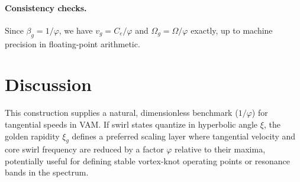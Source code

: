 \documentclass[11pt]{article}
\begin{document}
\paragraph{Consistency checks.}
Since $\beta_g=1/\varphi$, we have $v_g=C_e/\varphi$ and $\Omega_g=\Omega/\varphi$ exactly, up to machine precision in floating-point arithmetic.

\section*{Discussion}
This construction supplies a natural, dimensionless benchmark ($1/\varphi$) for tangential speeds in VAM. If swirl states quantize in hyperbolic angle $\xi$, the golden rapidity $\xi_g$ defines a preferred scaling layer where tangential velocity and core swirl frequency are reduced by a factor $\varphi$ relative to their maxima, potentially useful for defining stable vortex\hyp{}knot operating points or resonance bands in the spectrum.



\end{document}
